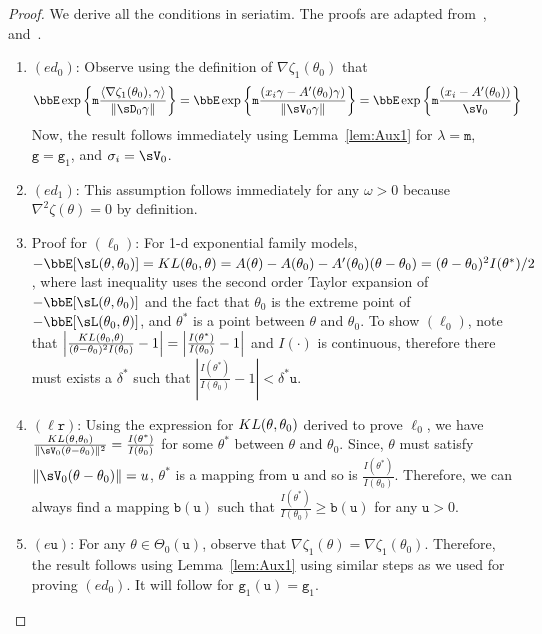 \documentclass[11pt]{article}
\newcommand{\scKL}{\textsc{KL}}
\begin{document}
\begin{proof}
    We derive all the conditions in seriatim. The proofs are adapted from~\cite{Panov2015}, and~\cite{Spokoiny2012}.
  \begin{enumerate}
    \item \({(e\!d_{0})} \):
    Observe using the definition of $\nabla \zeta_1(\theta_0)$ that 
        \begin{align}
            \bbE \exp\left\{
              \mathtt{m} \frac{\langle \nabla \zeta_1(\theta_0),\gamma \rangle}
              {\| \sD_0 \gamma \|}
              \right\} &= \bbE \exp\left\{
              \mathtt{m} \frac{  \left({x_i \gamma   -  A'(  \theta_0) \gamma}\right)}
              {\| \sV_0 \gamma \|}
              \right\} = \bbE \exp\left\{
              \mathtt{m} \frac{  \left({x_i   -  A'(  \theta_0) }\right)}
              {\sV_0 }
              \right\}
              \label{eq:ED0}
        \end{align}
    Now, the result follows immediately using Lemma~\ref{lem:Aux1} for $\lambda=\mathtt{m}$, $\mathtt{g}=\mathtt{g}_1$, and $\sigma_i=\sV_0$.
    \item \( {(e\!d_{1})} \):
      This assumption follows immediately for any $\omega>0$ because $\nabla^2\zeta(\theta) =0$ by definition. 
    \item Proof for \({(\ell_0)} \):
       For 1-d exponential family models, $-\bbE[\sL(\theta,\theta_0)]= \scKL(\theta_0,\theta) = A(\theta)-A(\theta_0) -A'(\theta_0)(\theta-\theta_0) = (\theta-\theta_0)^2I(\theta^*)/2$, where last inequality uses the second order Taylor expansion of $-\bbE[\sL(\theta,\theta_0)]$ and the fact that $\theta_0$ is the extreme point of $-\bbE[\sL(\theta_0,\theta)]$, and $\theta^*$ is a point between $\theta$ and $\theta_0$. To show $(\ell_0)$, note that $\left|\frac{\scKL(\theta_0,\theta)}{(\theta-\theta_0)^2I(\theta_0)} -1 \right|= \left|\frac{I(\theta^*)}{I(\theta_0)}-1\right|$ and $I(\cdot)$ is continuous, therefore there must exists a $\delta^*$ such that $\left|\frac{I(\theta^*)}{I(\theta_0)}-1\right|<\delta^* \mathtt{u}$.
      \item \( {(\ell{\mathtt{r}})} \): Using the expression for $\textsc{KL}(\theta,\theta_0)$ derived to prove $\ell_0$, we have $\frac{\textsc{KL}(\theta,\theta_0)}{\|\sV_0 (\theta - \theta_0)\|^2} = \frac{I(\theta^*)}{I(\theta_0)}$ for some $\theta^*$ between $\theta$ and $\theta_0$. Since, $\theta$ must satisfy $\|\sV_0(\theta-\theta_0)\|=u$,
        $\theta^*$ is a mapping from $\mathtt{u}$ and so is $\frac{I(\theta^*)}{I(\theta_0)}$. Therefore, we can always find a mapping $\mathtt{b}(\mathtt{u})$ such that $\frac{I(\theta^*)}{I(\theta_0)}\geq \mathtt{b}(\mathtt{u})$ for any $\mathtt{u}>0$. 
    \item \({(e\mathtt{u})} \): For any $\theta\in \Theta_0(\mathtt{u})$, observe that $\nabla \zeta_1(\theta) = \nabla \zeta_1(\theta_0)$. Therefore, the result follows using Lemma~\ref{lem:Aux1} using similar steps as we used for proving \({(e\!d_0)} \). It will follow for $\mathtt{g}_1(\mathtt{u})= \mathtt{g}_1$.
  \end{enumerate}
\end{proof}
\end{document}
